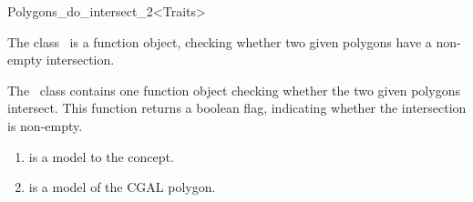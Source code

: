 
\ccRefPageBegin



\begin{ccRefFunctionObjectClass}{Polygons_do_intersect_2<Traits>}
\label{OVL_sec:polygon_do_intersect}
    
\ccDefinition
The class \ccClassTemplateName\ is a function object,
checking whether two given polygons have a non-empty 
intersection.


  

The \ccClassTemplateName\ class contains one function
object checking whether the two given polygons intersect.
This function returns a boolean flag, 
indicating whether the intersection is non-empty.


\begin{enumerate}
   \item
    is a model to the  concept.
   \item
    is a model of the CGAL polygon.
\end{enumerate}

\ccSeeAlso

 \\
 \\
 \\
 \\





\end{ccRefFunctionObjectClass}
